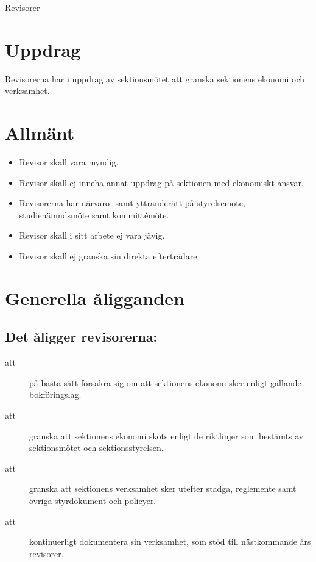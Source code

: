 \documentclass[a4paper]{article}
\begin{document}
\renewcommand{\forening}{Revisorer} %

\begin{foreningenv}{\forening{}} %
    \section{Uppdrag}
    Revisorerna har i uppdrag av sektionsmötet att granska sektionens ekonomi och verksamhet.
    
    \section{Allmänt}
    \begin{itemize}
        \item Revisor skall vara myndig.
        \item Revisor skall ej inneha annat uppdrag på sektionen med ekonomiskt ansvar.
        \item Revisorerna har närvaro- samt yttranderätt på styrelsemöte, studienämndsmöte samt kommittémöte.
        \item Revisor skall i sitt arbete ej vara jävig.
        \item Revisor skall ej granska sin direkta efterträdare.
    \end{itemize}
    
    \section{Generella åligganden}
    \subsection{Det åligger revisorerna:}
    \begin{description}
        \item[att] på bästa sätt försäkra sig om att sektionens ekonomi sker enligt gällande bokföringslag.
        \item[att] granska att sektionens ekonomi sköts enligt de riktlinjer som bestämts av sektionsmötet och sektionsstyrelsen.
        \item[att] granska att sektionens verksamhet sker utefter stadga, reglemente samt övriga styrdokument och policyer.
        \item[att] kontinuerligt dokumentera sin verksamhet, som stöd till nästkommande års revisorer.
    \end{description}
    

\end{foreningenv}
\end{document}
